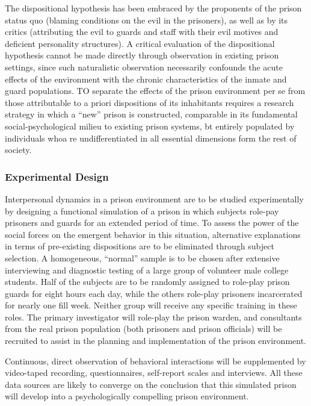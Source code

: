 The dispositional hypothesis has been embraced by the proponents of the prison status quo (blaming conditions on the evil in the prisoners), as well as by its critics (attributing the evil to guards and staff with their evil motives and deficient personality structures). A critical evaluation of the dispositional hypothesis cannot be made directly through observation in existing prison settings, since such naturalistic observation necessarily confounds the acute effects of the environment with the chronic characteristics of the inmate and guard populations. TO separate the effects of the prison environment per se from those attributable to a priori dispositions of its inhabitants requires a research strategy in which a “new” prison is constructed, comparable in its fundamental social-psychological milieu to existing prison systems, bt entirely populated by individuals whoa re undifferentiated in all essential dimensions form the rest of society.

\subsubsection{Experimental Design}
\label{experimentaldesign}

Interpersonal dynamics in a prison environment are to be studied experimentally by designing a functional simulation of a prison in which subjects role-pay prisoners and guards for an extended period of time. To assess the power of the social forces on the emergent behavior in this situation, alternative explanations in terms of pre-existing dispositions are to be eliminated through subject selection. A homogeneous, “normal” sample is to be chosen after extensive interviewing and diagnostic testing of a large group of volunteer male college students. Half of the subjects are to be randomly assigned to role-play prison guards for eight hours each day, while the others role-play prisoners incarcerated for nearly one fill week. Neither group will receive any specific training in these roles. The primary investigator will role-play the prison warden, and consultants from the real prison population (both prisoners and prison officials) will be recruited to assist in the planning and implementation of the prison environment.

Continuous, direct observation of behavioral interactions will be supplemented by video-taped recording, questionnaires, self-report scales and interviews. All these data sources are likely to converge on the conclusion that this simulated prison will develop into a psychologically compelling prison environment.

